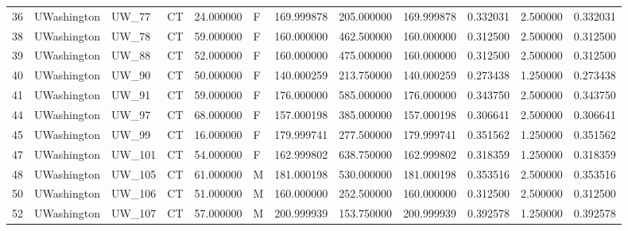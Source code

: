\begin{tabular}{llllrlrrrrrr}
36     &     UWashington &        UW\_77 &                 CT &  24.000000 &        F &       169.999878 &    205.000000 &  169.999878 &               0.332031 &            2.500000 &          0.332031 \\
38     &     UWashington &        UW\_78 &                 CT &  59.000000 &        F &       160.000000 &    462.500000 &  160.000000 &               0.312500 &            2.500000 &          0.312500 \\
39     &     UWashington &        UW\_88 &                 CT &  52.000000 &        F &       160.000000 &    475.000000 &  160.000000 &               0.312500 &            2.500000 &          0.312500 \\
40     &     UWashington &        UW\_90 &                 CT &  50.000000 &        F &       140.000259 &    213.750000 &  140.000259 &               0.273438 &            1.250000 &          0.273438 \\
41     &     UWashington &        UW\_91 &                 CT &  59.000000 &        F &       176.000000 &    585.000000 &  176.000000 &               0.343750 &            2.500000 &          0.343750 \\
44     &     UWashington &        UW\_97 &                 CT &  68.000000 &        F &       157.000198 &    385.000000 &  157.000198 &               0.306641 &            2.500000 &          0.306641 \\
45     &     UWashington &        UW\_99 &                 CT &  16.000000 &        F &       179.999741 &    277.500000 &  179.999741 &               0.351562 &            1.250000 &          0.351562 \\
47     &     UWashington &       UW\_101 &                 CT &  54.000000 &        F &       162.999802 &    638.750000 &  162.999802 &               0.318359 &            1.250000 &          0.318359 \\
48     &     UWashington &       UW\_105 &                 CT &  61.000000 &        M &       181.000198 &    530.000000 &  181.000198 &               0.353516 &            2.500000 &          0.353516 \\
50     &     UWashington &       UW\_106 &                 CT &  51.000000 &        M &       160.000000 &    252.500000 &  160.000000 &               0.312500 &            2.500000 &          0.312500 \\
52     &     UWashington &       UW\_107 &                 CT &  57.000000 &        M &       200.999939 &    153.750000 &  200.999939 &               0.392578 &            1.250000 &          0.392578 \\

\end{tabular}
